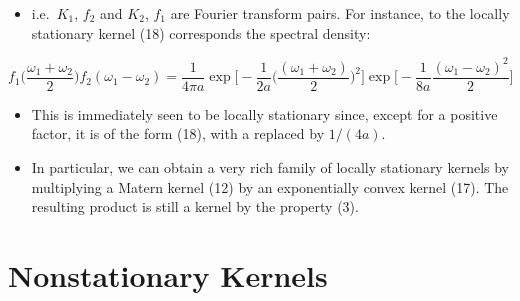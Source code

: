 \documentclass[
  ignorenonframetext,
]{beamer}
\providecommand{\tightlist}{%
  \setlength{\itemsep}{0pt}\setlength{\parskip}{0pt}}
\begin{document}
\begin{frame}{}
\protect\hypertarget{section-14}{}
\begin{itemize}
\tightlist
\item
  i.e.~\(K_1\), \(f_2\) and \(K_2\), \(f_1\) are Fourier transform
  pairs. For instance, to the locally stationary kernel (18) corresponds
  the spectral density:
\end{itemize}

\tiny

\[
f_1\big(\frac{\omega_1 + \omega_2}{2}\big)f_2(\omega_1 - \omega_2)={\frac 1 {4\pi a}}\exp \Big[-\frac 1{2a}\big(\frac {(\omega_1 + \omega_2)} 2\big)^2\Big] \exp\Big[-\frac 1{8a} \frac {(\omega_1 - \omega_2)^2}2\Big]
\]

\normalsize

\begin{itemize}
\item
  This is immediately seen to be locally stationary since, except for a
  positive factor, it is of the form (18), with a replaced by
  \(1/(4a)\).
\item
  In particular, we can obtain a very rich family of locally stationary
  kernels by multiplying a Matern kernel (12) by an exponentially convex
  kernel (17). The resulting product is still a kernel by the property
  (3).
\end{itemize}
\end{frame}

\hypertarget{nonstationary-kernels}{%
\section{Nonstationary Kernels}\label{nonstationary-kernels}}
\end{document}
